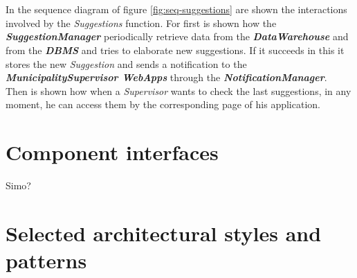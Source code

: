 \documentclass[a4paper]{report}
\begin{document}
\\\\
In the sequence diagram of figure \ref{fig:seq-suggestions} are shown the interactions involved by the \textit{Suggestions} function. For first is shown how the \textbf{\textit{SuggestionManager}} periodically retrieve data from the \textbf{\textit{DataWarehouse}} and from the \textbf{\textit{DBMS}} and tries to elaborate new suggestions. If it succeeds in this it stores the new \textit{Suggestion} and sends a notification to the \textbf{\textit{MunicipalitySupervisor WebApps}} through the \textbf{\textit{NotificationManager}}.\\
Then is shown how when a \textit{Supervisor} wants to check the last suggestions, in any moment, he can access them by the corresponding page of his application.
\section{Component interfaces}

Simo?
\section{Selected architectural	styles and patterns}
\end{document}
